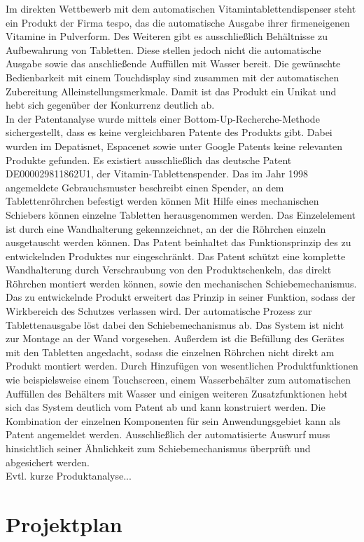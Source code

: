 Im direkten Wettbewerb mit dem automatischen Vitamintablettendispenser steht ein Produkt der Firma tespo, das die automatische Ausgabe ihrer firmeneigenen Vitamine in Pulverform. Des Weiteren gibt es ausschließlich Behältnisse zu Aufbewahrung von Tabletten. Diese stellen jedoch nicht die automatische Ausgabe sowie das anschließende Auffüllen mit Wasser bereit. Die gewünschte Bedienbarkeit mit einem Touchdisplay sind zusammen mit der automatischen Zubereitung Alleinstellungsmerkmale. Damit ist das Produkt ein Unikat und hebt sich gegenüber der Konkurrenz deutlich ab.\\
In der Patentanalyse wurde mittels einer Bottom-Up-Recherche-Methode sichergestellt, dass es keine vergleichbaren Patente des Produkts gibt. Dabei wurden im Depatisnet, Espacenet sowie unter Google Patents keine relevanten Produkte gefunden. Es existiert ausschließlich das deutsche Patent DE000029811862U1, der Vitamin-Tablettenspender. Das im Jahr 1998 angemeldete Gebrauchsmuster beschreibt einen Spender, an dem Tablettenröhrchen befestigt werden können Mit Hilfe eines mechanischen Schiebers können einzelne Tabletten herausgenommen werden. Das Einzelelement ist durch eine Wandhalterung gekennzeichnet, an der die Röhrchen einzeln ausgetauscht werden können. Das Patent beinhaltet das Funktionsprinzip des zu entwickelnden Produktes nur eingeschränkt. Das Patent schützt eine komplette Wandhalterung durch Verschraubung von den Produktschenkeln, das direkt Röhrchen montiert werden können, sowie den mechanischen Schiebemechanismus. Das zu entwickelnde Produkt erweitert das Prinzip in seiner Funktion, sodass der Wirkbereich des Schutzes verlassen wird. Der automatische Prozess zur Tablettenausgabe löst dabei den Schiebemechanismus ab. Das System ist nicht zur Montage an der Wand vorgesehen. Außerdem ist die Befüllung des Gerätes mit den Tabletten angedacht, sodass die einzelnen Röhrchen nicht direkt am Produkt montiert werden. Durch Hinzufügen von wesentlichen Produktfunktionen wie beispielsweise einem Touchscreen, einem Wasserbehälter zum automatischen Auffüllen des Behälters mit Wasser und einigen weiteren Zusatzfunktionen hebt sich das System deutlich vom Patent ab und kann konstruiert werden. Die Kombination der einzelnen Komponenten für sein Anwendungsgebiet kann als Patent angemeldet werden. Ausschließlich der automatisierte Auswurf muss hinsichtlich seiner Ähnlichkeit zum Schiebemechanismus überprüft und abgesichert werden.\\
Evtl. kurze Produktanalyse...

\section{Projektplan}


